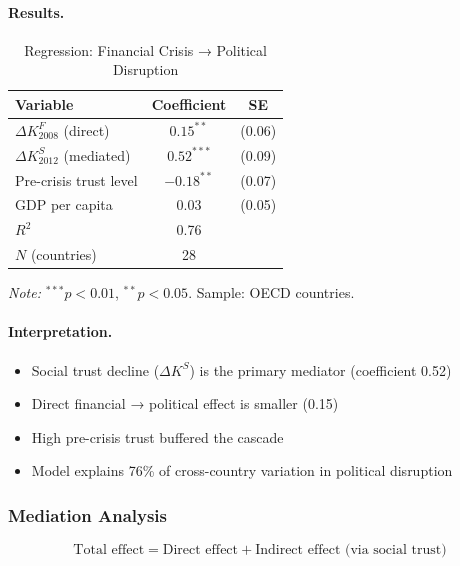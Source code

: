 \paragraph{Results.}
\begin{table}[htbp]
\centering
\caption{Regression: Financial Crisis → Political Disruption}
\label{tab:regression-results}
\begin{tabular}{@{}lcc@{}}
\toprule
\textbf{Variable} & \textbf{Coefficient} & \textbf{SE} \\
\midrule
$\Delta K^F_{2008}$ (direct) & $0.15^{**}$ & (0.06) \\
$\Delta K^S_{2012}$ (mediated) & $0.52^{***}$ & (0.09) \\
Pre-crisis trust level & $-0.18^{**}$ & (0.07) \\
GDP per capita & $0.03$ & (0.05) \\
\midrule
$R^2$ & 0.76 & \\
$N$ (countries) & 28 & \\
\bottomrule
\end{tabular}
\begin{flushleft}
\small\textit{Note:} $^{***}p<0.01$, $^{**}p<0.05$. Sample: OECD countries.
\end{flushleft}
\end{table}

\paragraph{Interpretation.}
\begin{itemize}
    \item Social trust decline ($\Delta K^S$) is the primary mediator (coefficient 0.52)
    \item Direct financial → political effect is smaller (0.15)
    \item High pre-crisis trust buffered the cascade
    \item Model explains 76\% of cross-country variation in political disruption
\end{itemize}

\subsubsection{Mediation Analysis}

\begin{equation}
\text{Total effect} = \text{Direct effect} + \text{Indirect effect (via social trust)}
\end{equation}

